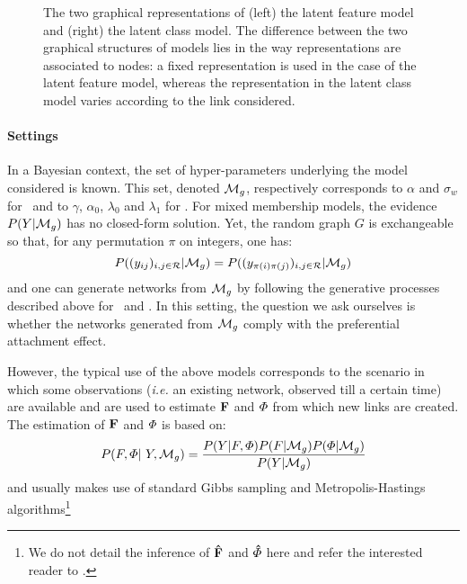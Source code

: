 \begin{figure}[t]
	\centering
	\vspace{1cm}
	\scalebox{0.88}{
	}
	\endminipage
	\scalebox{0.88}{
		}
	\endminipage
	\caption{The two graphical representations of (left) the latent feature model and (right) the latent class model. The difference between the two graphical structures of  models lies in the way representations are associated to nodes: a fixed representation is used in the case of the latent feature model, whereas the representation in the latent class model varies according to the link considered.}
	\label{fig:mmm}
\end{figure}

\paragraph{Settings} In a Bayesian context, the set of hyper-parameters underlying the model considered is known. This set, denoted $\mathcal{M}_g$, respectively corresponds to $\alpha$ and $\sigma_w$ for \ifm\ and to $\gamma$,  $\alpha_0$, $\lambda_0$ and $\lambda_1$ for \imb. For mixed membership models, the evidence $P(Y|\mathcal{M}_g)$ has no closed-form solution. Yet, the random graph $G$ is exchangeable so that, for any permutation $\pi$ on integers, one has:
%
\[
P((y_{ij})_{i,j\in \mathcal{R}} | \mathcal{M}_g) = P((y_{\pi(i)\pi(j)})_{i,j\in \mathcal{R}} | \mathcal{M}_g)
\]
%
and one can generate networks from $\mathcal{M}_g$ by following the generative processes described above for \ifm\ and \imb. In this setting, the question we ask ourselves is whether the networks generated from $\mathcal{M}_g$ comply with the preferential attachment effect.

However, the typical use of the above models corresponds to the scenario in which some observations (\textit{i.e.} an existing network, observed till a certain time) are available and are used to estimate $\mathbf{F}$ and $\mat{\Phi}$ from which new links are created. The estimation of $\mathbf{F}$ and $\mat{\Phi}$ is based on:
%
\begin{equation}
    \p(F, \Phi | Y, \mg) = \frac{\p(Y|F,\Phi)\p(F|\mg)\p(\Phi|\mg)}{\p(Y|\mg)}
\end{equation}
%
and usually makes use of standard Gibbs sampling and Metropolis-Hastings algorithms\footnote{We do not detail the inference of  $\mathbf{\hat{F}}$ and $\mat{\hat{\Phi}}$ here and refer the interested reader to \cite{miller2009nonparametric,griffiths2011indian,griffiths2011indian,fan2015dynamic}.}

